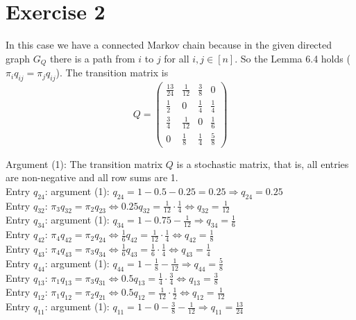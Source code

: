 \section*{Exercise 2}
In this case we have a connected Markov chain because in the given directed graph $G_Q$ there is a path from $i$ to $j$ for all $i,j\in\left[n\right]$.
So the Lemma 6.4 holds ($\pi_iq_{ij}=\pi_jq_{ij}$).
The transition matrix is  \[Q=\left(\begin{matrix}
\frac{13}{24}&\frac{1}{12}&\frac{3}{8}&0\\
\frac{1}{2}&0&\frac{1}{4}&\frac{1}{4}\\
\frac{3}{4}&\frac{1}{12}&0&\frac{1}{6}\\
0&\frac{1}{8}&\frac{1}{4}&\frac{5}{8}
\end{matrix}\right)\]

Argument (1): The transition matrix $Q$ is a stochastic matrix, that is, all entries are non-negative and all row sums are 1.\\
Entry $q_{24}$: argument (1): $q_{24}=1-0.5 -0.25  =0.25 \Rightarrow q_{24} = 0.25$\\
Entry $q_{32}$: $\pi_3q_{32} = \pi_2q_{23}\Leftrightarrow0.25q_{32}= \frac{1}{12}\cdot\frac{1}{4}\Leftrightarrow q_{32} = \frac{1}{12}$\\
Entry $q_{34}$: argument (1): $q_{34}=1-0.75 -\frac{1}{12}\Rightarrow q_{34} = \frac{1}{6}$\\
Entry $q_{42}$: $\pi_4q_{42} = \pi_2q_{24}\Leftrightarrow\frac{1}{6}q_{42}= \frac{1}{12}\cdot\frac{1}{4}\Leftrightarrow q_{42} = \frac{1}{8}$\\
Entry $q_{43}$: $\pi_4q_{43} = \pi_3q_{34}\Leftrightarrow\frac{1}{6}q_{43}= \frac{1}{6}\cdot\frac{1}{4}\Leftrightarrow q_{43} = \frac{1}{4}$\\
Entry $q_{44}$: argument (1): $q_{44}=1-\frac{1}{8} -\frac{1}{12}\Rightarrow q_{44} = \frac{5}{8}$\\
Entry $q_{13}$: $\pi_1q_{13} = \pi_3q_{31}\Leftrightarrow0.5q_{13}= \frac{1}{4}\cdot\frac{3}{4}\Leftrightarrow q_{13} = \frac{3}{8}$\\
Entry $q_{12}$: $\pi_1q_{12} = \pi_2q_{21}\Leftrightarrow0.5q_{12}= \frac{1}{12}\cdot\frac{1}{2}\Leftrightarrow q_{12} = \frac{1}{12}$\\
Entry $q_{11}$: argument (1): $q_{11}=1-0-\frac{3}{8} -\frac{1}{12}\Rightarrow q_{11} = \frac{13}{24}$\\
